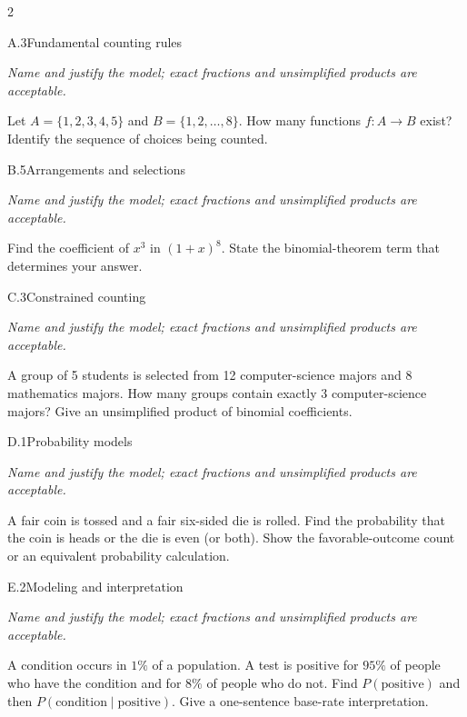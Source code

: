 \documentclass[9pt]{extarticle}
\begin{document}
\CoreWorkArea
\FormBreak
{}
\begin{multicols}{2}
\begin{CoreProblem}{A.3}{Fundamental counting rules}
{\scriptsize\textit{Name and justify the model; exact fractions and unsimplified products are acceptable.}\par}
Let $A=\{1,2,3,4,5\}$ and $B=\{1,2,\ldots,8\}$. How many functions
    $f:A\to B$ exist? Identify the sequence of choices being counted.
\end{CoreProblem}
\begin{CoreProblem}{B.5}{Arrangements and selections}
{\scriptsize\textit{Name and justify the model; exact fractions and unsimplified products are acceptable.}\par}
Find the coefficient of $x^3$ in $(1+x)^8$. State the binomial-theorem
    term that determines your answer.
\end{CoreProblem}
\begin{CoreProblem}{C.3}{Constrained counting}
{\scriptsize\textit{Name and justify the model; exact fractions and unsimplified products are acceptable.}\par}
A group of 5 students is selected from 12 computer-science majors and
    8 mathematics majors. How many groups contain exactly 3 computer-science
    majors? Give an unsimplified product of binomial coefficients.
\end{CoreProblem}
\columnbreak
\begin{CoreProblem}{D.1}{Probability models}
{\scriptsize\textit{Name and justify the model; exact fractions and unsimplified products are acceptable.}\par}
A fair coin is tossed and a fair six-sided die is rolled. Find the
    probability that the coin is heads or the die is even (or both). Show the
    favorable-outcome count or an equivalent probability calculation.
\end{CoreProblem}
\begin{CoreProblem}{E.2}{Modeling and interpretation}
{\scriptsize\textit{Name and justify the model; exact fractions and unsimplified products are acceptable.}\par}
A condition occurs in $1\%$ of a population. A test is positive for
    $95\%$ of people who have the condition and for $8\%$ of people who do not.
    Find $P(\text{positive})$ and then
    $P(\text{condition}\mid\text{positive})$. Give a one-sentence base-rate
    interpretation.
\end{CoreProblem}
\end{multicols}
\end{document}
